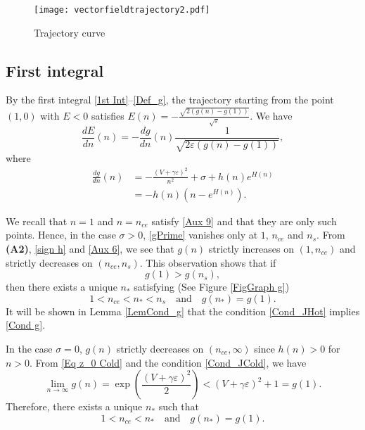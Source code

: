 \documentclass{amsart}
\newcommand{\veps}{\varepsilon}
\numberwithin{equation}{section}
\theoremstyle{plain}%
\theoremstyle{definition}
\theoremstyle{remark}
\theoremstyle{remark}
\begin{document}
\begin{figure}[h]
    \centering
        \texttt{[image: vectorfieldtrajectory2.pdf]}
        \caption{Trajectory curve}
        \label{FigTrajec}
\end{figure}

\subsection{First integral}
By the first integral \eqref{1st Int}--\eqref{Def_g}, the trajectory starting from the point $(1,0)$ with $E<0$ satisfies $E(n) = -\frac{\sqrt{2(g(n)-g(1))}}{\sqrt{\veps}}$. We have 
\begin{equation}\label{EPrime}
\frac{dE}{dn}(n) = -\frac{dg}{dn}(n)\frac{1}{\sqrt{2\veps(g(n)-g(1))}},
\end{equation}
where
\begin{equation}\label{gPrime}
\begin{split}
\frac{dg}{dn}(n)
& = -\frac{(V+\gamma\veps)^2}{n^2} + \sigma  +h(n) e^{H(n)} \\
& = -h(n)\left(n-  e^{H(n)}\right).
\end{split}
\end{equation}

We recall that $n=1$ and $n=n_{ce}$ satisfy \eqref{Aux 9} and that they are only such points. Hence, in the case $\sigma>0$, \eqref{gPrime} vanishes only at $1$, $n_{ce}$ and $n_s$. From \textbf{(A2)}, \eqref{sign h} and \eqref{Aux 6}, we see that $g(n)$ strictly increases on $(1,n_{ce})$ and strictly decreases on $(n_{ce}, n_s)$. This observation shows that if 
\begin{equation}\label{Cond g}
g(1)>g(n_s),
\end{equation}
then there exists a unique $n_\ast$ satisfying (See Figure \ref{FigGraph g})
\begin{equation}\label{g(n)=g(1)hot}
1<n_{ce} < n_\ast < n_s \quad  \text{and} \quad g(n_\ast)=g(1).
\end{equation}
It will be shown in Lemma \ref{LemCond_g} that the condition \eqref{Cond_JHot} implies \eqref{Cond g}. 

In the case $\sigma = 0$, $g(n)$ strictly decreases on $(n_{ce},\infty)$ since $h(n)>0$ for $n>0$. From  \eqref{Eq z_0 Cold} and the condition \eqref{Cond_JCold}, we have 
$$\lim_{n \to \infty}g(n) = \exp\left(\frac{(V+\gamma\veps)^2}{2}\right) < (V+\gamma\veps)^2+1 =g(1).$$
Therefore, there exists a unique $n_\ast$ such that 
\begin{equation}\label{g(n)=g(1)cold}
1<n_{ce} < n_\ast \quad \text{and} \quad g(n_\ast)=g(1).
\end{equation}
 
\end{document}
